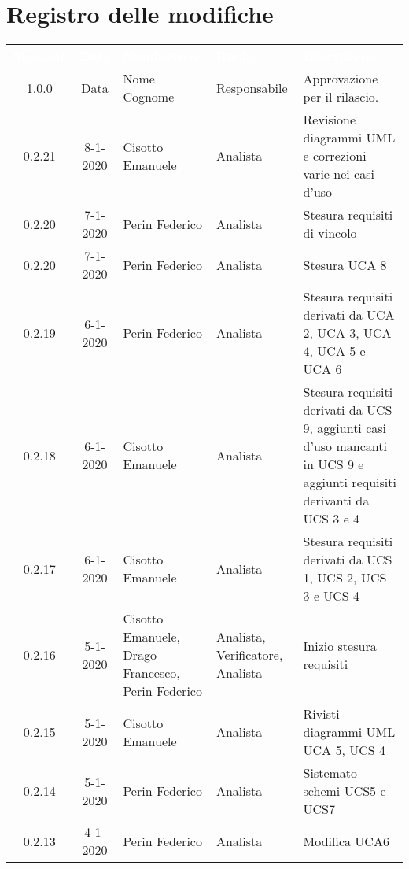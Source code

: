 \section*{Registro delle modifiche}
{
\renewcommand{\arraystretch}{1.5}
\centering
\begin{longtable}{ c c  C{4cm}  C{3cm} C{4cm}}
\textcolor{white}{\textbf{Versione}} & \textcolor{white}{\textbf{Data}} & \textcolor{white}{\textbf{Nominativo}} & \textcolor{white}{\textbf{Ruolo}} & \textcolor{white}{\textbf{Descrizione}}\\	


1.0.0 & Data & Nome Cognome & Responsabile & Approvazione per il rilascio.  \\

0.2.21 & 8-1-2020 & Cisotto Emanuele & Analista & Revisione diagrammi UML e correzioni varie nei casi d'uso \\

0.2.20 & 7-1-2020 & Perin Federico & Analista & Stesura requisiti di vincolo\\

0.2.20 & 7-1-2020 & Perin Federico & Analista & Stesura UCA 8\\

0.2.19 & 6-1-2020 & Perin Federico & Analista & Stesura requisiti derivati da UCA 2, UCA 3, UCA 4, UCA 5 e UCA 6\\

0.2.18 & 6-1-2020 & Cisotto Emanuele & Analista & Stesura requisiti derivati da UCS 9, aggiunti casi d'uso mancanti in UCS 9 e aggiunti requisiti derivanti da UCS 3 e 4 \\

0.2.17 & 6-1-2020 & Cisotto Emanuele & Analista & Stesura requisiti derivati da UCS 1, UCS 2, UCS 3 e UCS 4 \\

0.2.16 & 5-1-2020 & Cisotto Emanuele, Drago Francesco, Perin Federico & Analista, Verificatore, Analista & Inizio stesura requisiti \\

0.2.15 & 5-1-2020 & Cisotto Emanuele & Analista & Rivisti diagrammi UML UCA 5, UCS 4 \\

0.2.14 & 5-1-2020 & Perin Federico & Analista & Sistemato schemi UCS5 e UCS7 \\

0.2.13 & 4-1-2020 & Perin Federico & Analista & Modifica UCA6 \\


\end{longtable}}

